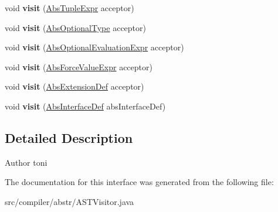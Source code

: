 \begin{DoxyCompactItemize}
\item 
\mbox{\label{interfacecompiler_1_1abstr_1_1_a_s_t_visitor_a39772f33026a38ec2c9852a1d287d359}} 
void {\bfseries visit} (\hyperlink{classcompiler_1_1abstr_1_1tree_1_1expr_1_1_abs_tuple_expr}{Abs\+Tuple\+Expr} acceptor)
\item 
\mbox{\label{interfacecompiler_1_1abstr_1_1_a_s_t_visitor_a51b8b1b0082d13990d5d5ea7d321d119}} 
void {\bfseries visit} (\hyperlink{classcompiler_1_1abstr_1_1tree_1_1type_1_1_abs_optional_type}{Abs\+Optional\+Type} acceptor)
\item 
\mbox{\label{interfacecompiler_1_1abstr_1_1_a_s_t_visitor_a2b5999f86ff2fb48638a69f40107aa11}} 
void {\bfseries visit} (\hyperlink{classcompiler_1_1abstr_1_1tree_1_1expr_1_1_abs_optional_evaluation_expr}{Abs\+Optional\+Evaluation\+Expr} acceptor)
\item 
\mbox{\label{interfacecompiler_1_1abstr_1_1_a_s_t_visitor_a2c1a4b9daf43bae2d7b6d6f98afdae1a}} 
void {\bfseries visit} (\hyperlink{classcompiler_1_1abstr_1_1tree_1_1expr_1_1_abs_force_value_expr}{Abs\+Force\+Value\+Expr} acceptor)
\item 
\mbox{\label{interfacecompiler_1_1abstr_1_1_a_s_t_visitor_a23293668ccb6ece987a882ffb7e08dd6}} 
void {\bfseries visit} (\hyperlink{classcompiler_1_1abstr_1_1tree_1_1def_1_1_abs_extension_def}{Abs\+Extension\+Def} acceptor)
\item 
\mbox{\label{interfacecompiler_1_1abstr_1_1_a_s_t_visitor_ad0894daa63dc8c352e68859ec9a01ebc}} 
void {\bfseries visit} (\hyperlink{classcompiler_1_1abstr_1_1tree_1_1def_1_1_abs_interface_def}{Abs\+Interface\+Def} abs\+Interface\+Def)
\end{DoxyCompactItemize}


\subsection{Detailed Description}
\begin{DoxyAuthor}{Author}
toni 
\end{DoxyAuthor}


The documentation for this interface was generated from the following file\+:\begin{DoxyCompactItemize}
\item 
src/compiler/abstr/A\+S\+T\+Visitor.\+java\end{DoxyCompactItemize}

